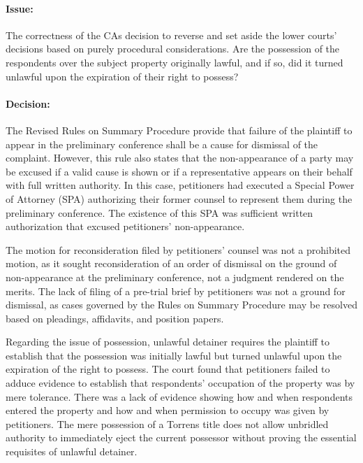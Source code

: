 \documentclass[
12pt,
oneside,
onehalfspacing,
headsepline
]{DigestCollection}
\begin{document}
\paragraph{Issue:}
\label{b6948fa0-09fd-11ef-932c-63c852f65e48}


The correctness of the CAs decision to reverse and set aside the lower courts' decisions based on purely procedural considerations. Are the possession of the respondents over the subject property originally lawful, and if so, did it turned unlawful upon the expiration of their right to possess?

\paragraph{Decision:}
\label{b88fea70-09fd-11ef-932c-63c852f65e48}


The Revised Rules on Summary Procedure provide that failure of the plaintiff to appear in the preliminary conference shall be a cause for dismissal of the complaint. However, this rule also states that the non-appearance of a party may be excused if a valid cause is shown or if a representative appears on their behalf with full written authority. In this case, petitioners had executed a Special Power of Attorney (SPA) authorizing their former counsel to represent them during the preliminary conference. The existence of this SPA was sufficient written authorization that excused petitioners' non-appearance.

The motion for reconsideration filed by petitioners' counsel was not a prohibited motion, as it sought reconsideration of an order of dismissal on the ground of non-appearance at the preliminary conference, not a judgment rendered on the merits. The lack of filing of a pre-trial brief by petitioners was not a ground for dismissal, as cases governed by the Rules on Summary Procedure may be resolved based on pleadings, affidavits, and position papers.

Regarding the issue of possession, unlawful detainer requires the plaintiff to establish that the possession was initially lawful but turned unlawful upon the expiration of the right to possess. The court found that petitioners failed to adduce evidence to establish that respondents' occupation of the property was by mere tolerance. There was a lack of evidence showing how and when respondents entered the property and how and when permission to occupy was given by petitioners. The mere possession of a Torrens title does not allow unbridled authority to immediately eject the current possessor without proving the essential requisites of unlawful detainer.
\end{document}
